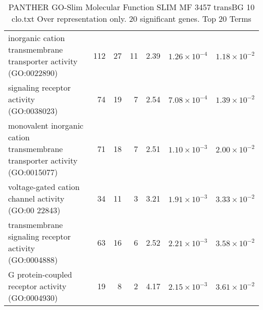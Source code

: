 \begin{table}[ht]
\begin{adjustbox}{width=\textwidth}
\begin{tabular}{lrrrlrr}
  inorganic cation transmembrane transporter activity (GO:0022890) & 112 & 27 & 11 & 2.39 & $1.26 \times 10^{-4}$ & $1.18 \times 10^{-2}$ \\ 
  signaling receptor activity (GO:0038023) & 74 & 19 & 7 & 2.54 & $7.08 \times 10^{-4}$ & $1.39 \times 10^{-2}$ \\ 
  monovalent inorganic cation transmembrane transporter activity (GO:0015077) & 71 & 18 & 7 & 2.51 & $1.10 \times 10^{-3}$ & $2.00 \times 10^{-2}$ \\ 
  voltage-gated cation channel activity (GO:00 22843) & 34 & 11 & 3 & 3.21 & $1.91 \times 10^{-3}$ & $3.33 \times 10^{-2}$ \\ 
  transmembrane signaling receptor activity (GO:0004888) & 63 & 16 & 6 & 2.52 & $2.21 \times 10^{-3}$ & $3.58 \times 10^{-2}$ \\ 
  G protein-coupled receptor activity (GO:0004930) & 19 & 8 & 2 & 4.17 & $2.15 \times 10^{-3}$ & $3.61 \times 10^{-2}$ \\ 
   \hline
\end{tabular}
\end{adjustbox}
\caption{PANTHER GO-Slim Molecular Function SLIM MF 3457 transBG 10 clo.txt Over representation only. 20 significant genes. Top 20 Terms} 
\label{tab:PANTHER GO-Slim Molecular Function SLIM MF 3457 transBG 10 clo.txt Over representation only. 20 significant genes. Top 20 Terms}
\end{table}


